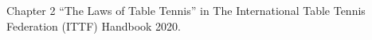 Chapter 2 ``The Laws of Table Tennis'' in 
The International Table Tennis Federation (ITTF) Handbook 2020.
